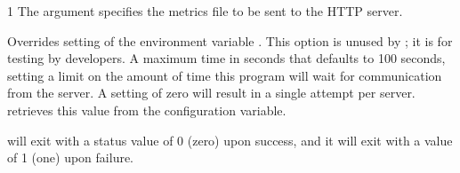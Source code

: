 \begin{ManPage}{\label{man-condor-dagman-metrics-reporter}}{1}
The  argument specifies the metrics file to be sent
to the HTTP server.

\begin{Options}
     {Overrides setting of the environment variable
     . 
     This option is unused by ; it is for testing by developers.}
    {A maximum time in seconds that defaults to 100 seconds,
    setting a limit on the amount of time this program will wait for
    communication from the server.  
    A setting of zero will result in a single attempt per server. 
     retrieves this value from the 
     configuration variable.}
\end{Options}

\ExitStatus

 will exit with a status value of 0 (zero)
 upon success,
and it will exit with a value of 1 (one) upon failure.

\end{ManPage}

